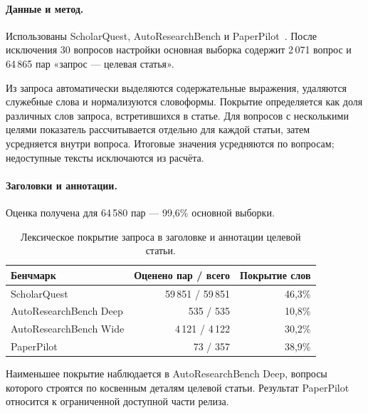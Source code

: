 \paragraph{Данные и метод.}
Использованы ScholarQuest, AutoResearchBench и PaperPilot~\cite{pan2026scholarquest,xiong2026autoresearchbench,li2026paperpilot}. После исключения 30 вопросов настройки основная выборка содержит 2\,071 вопрос и 64\,865 пар «запрос --- целевая статья».

Из запроса автоматически выделяются содержательные выражения, удаляются служебные слова и нормализуются словоформы. Покрытие определяется как доля различных слов запроса, встретившихся в статье. Для вопросов с несколькими целями показатель рассчитывается отдельно для каждой статьи, затем усредняется внутри вопроса. Итоговые значения усредняются по вопросам; недоступные тексты исключаются из расчёта.

\paragraph{Заголовки и аннотации.}
Оценка получена для 64\,580 пар --- 99,6\% основной выборки.

\begin{table}[htbp]
\centering
\caption{Лексическое покрытие запроса в заголовке и аннотации целевой статьи.}
\label{tab:lexical-ta}
\small
\begin{tabular}{lrr}
\toprule
Бенчмарк & Оценено пар / всего & Покрытие слов \\
\midrule
ScholarQuest & 59\,851 / 59\,851 & 46,3\% \\
AutoResearchBench Deep & 535 / 535 & 10,8\% \\
AutoResearchBench Wide & 4\,121 / 4\,122 & 30,2\% \\
PaperPilot & 73 / 357 & 38,9\% \\
\bottomrule
\end{tabular}
\end{table}

Наименьшее покрытие наблюдается в AutoResearchBench Deep, вопросы которого строятся по косвенным деталям целевой статьи. Результат PaperPilot относится к ограниченной доступной части релиза.

